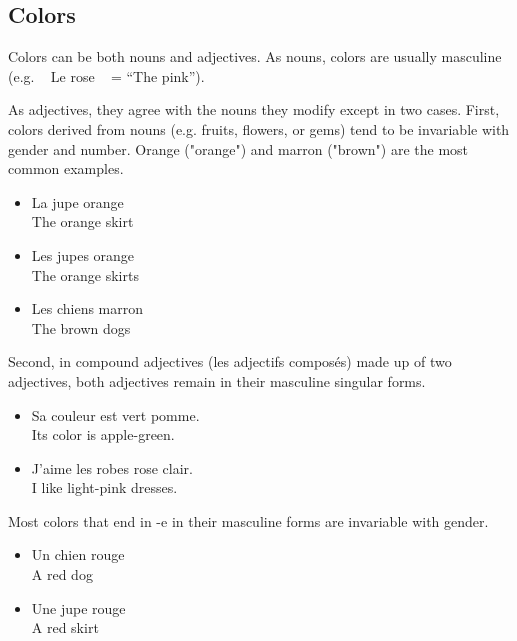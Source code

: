 \pagebreak
\subsection{Colors}

Colors can be both nouns and adjectives. As nouns, colors are usually masculine (e.g. \guillemotleft~ Le rose \guillemotright~ = ``The pink'').

As adjectives, they agree with the nouns they modify except in two cases. First, colors derived from nouns (e.g. fruits, flowers, or gems) tend to be invariable with gender and number. Orange ("orange") and marron ("brown") are the most common examples.

\begin{itemize}
  \item  La jupe orange \\ The orange skirt
  \item  Les jupes orange \\ The orange skirts
  \item  Les chiens marron \\ The brown dogs
\end{itemize}

Second, in compound adjectives (les adjectifs composés) made up of two adjectives, both adjectives remain in their masculine singular forms.

\begin{itemize}
  \item  Sa couleur est vert pomme. \\ Its color is apple-green.
  \item  J'aime les robes rose clair. \\ I like light-pink dresses.
\end{itemize}

Most colors that end in -e in their masculine forms are invariable with gender.

\begin{itemize}
  \item  Un chien rouge \\ A red dog
  \item  Une jupe rouge \\ A red skirt
\end{itemize}

\huge


